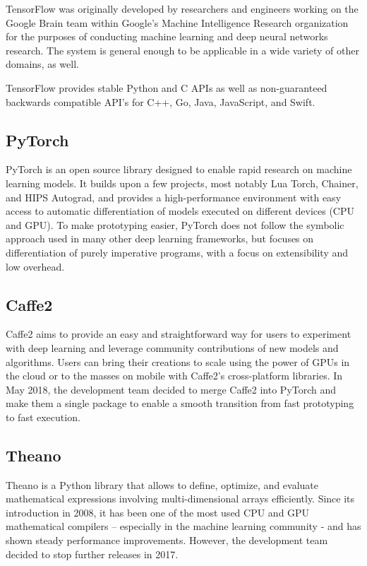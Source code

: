         TensorFlow was originally developed by researchers and engineers working on the Google Brain team within Google's Machine Intelligence Research organization for the purposes of conducting machine learning and deep neural networks research. The system is general enough to be applicable in a wide variety of other domains, as well.

        TensorFlow provides stable Python and C APIs as well as non-guaranteed backwards compatible API's for C++, Go, Java, JavaScript, and Swift. \cite{abadi2016tensorflow}
        
    \subsection{PyTorch}
        PyTorch is an open source library designed to enable rapid research on machine learning models. It builds upon a few projects, most notably Lua Torch, Chainer, and HIPS Autograd, and provides a high-performance environment with easy access to automatic differentiation of models executed on different devices (CPU and GPU). To make prototyping easier, PyTorch does not follow the symbolic approach used in many other deep learning frameworks, but focuses on differentiation of purely imperative programs, with a focus on extensibility and low overhead. \cite{paszke2017automatic}
        
    \subsection{Caffe2}
        Caffe2 aims to provide an easy and straightforward way for users to experiment with deep learning and leverage community contributions of new models and algorithms. Users can bring their creations to scale using the power of GPUs in the cloud or to the masses on mobile with Caffe2's cross-platform libraries. In May 2018, the development team decided to merge Caffe2 into PyTorch and make them a single package to enable a smooth transition from fast prototyping to fast execution. \cite{caffe2}
        
    \subsection{Theano}
        Theano is a Python library that allows to define, optimize, and evaluate mathematical expressions involving multi-dimensional arrays efficiently. Since its introduction in 2008, it has been one of the most used CPU and GPU mathematical compilers – especially in the machine learning community - and has shown steady performance improvements. However, the development team decided to stop further releases in 2017. \cite{2016arXiv160502688short}
        
